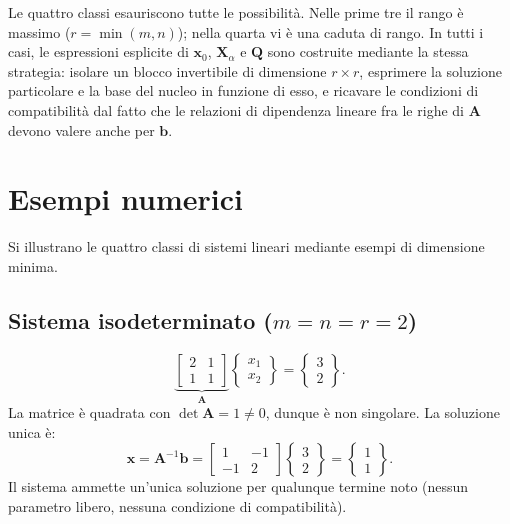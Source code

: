 \begin{oss}
	Le quattro classi esauriscono tutte le possibilit\`a. Nelle prime tre il rango \`e massimo ($r=\min(m,n)$); nella quarta vi \`e una caduta di rango. In tutti i casi, le espressioni esplicite di $\bm{x}_0$, $\bm{X}_\alpha$ e $\bm{Q}$ sono costruite mediante la stessa strategia: isolare un blocco invertibile di dimensione $r\times r$, esprimere la soluzione particolare e la base del nucleo in funzione di esso, e ricavare le condizioni di compatibilit\`a dal fatto che le relazioni di dipendenza lineare fra le righe di $\bm{A}$ devono valere anche per $\bm{b}$.
\end{oss}

\section{Esempi numerici}


Si illustrano le quattro classi di sistemi lineari mediante esempi di dimensione minima.

\subsection{Sistema isodeterminato
	(\texorpdfstring{$m=n=r=2$}{m=n=r=2})}

\begin{equation}
	\underbrace{\begin{bmatrix} 2 & 1 \\ 1 & 1 \end{bmatrix}}_{\bm{A}}
	\begin{Bmatrix} x_1 \\ x_2 \end{Bmatrix}
	= \begin{Bmatrix} 3 \\ 2 \end{Bmatrix}.
\end{equation}
La matrice \`e quadrata con $\det\bm{A}=1 \neq 0$, dunque \`e non singolare. La soluzione unica \`e:
\begin{equation}
	\bm{x} = \bm{A}^{-1}\bm{b}
	= \begin{bmatrix} 1 & -1 \\ -1 & 2 \end{bmatrix}
	\begin{Bmatrix} 3 \\ 2 \end{Bmatrix}
	= \begin{Bmatrix} 1 \\ 1 \end{Bmatrix}.
\end{equation}
Il sistema ammette un'unica soluzione per qualunque termine noto
(nessun parametro libero, nessuna condizione di compatibilit\`a).


